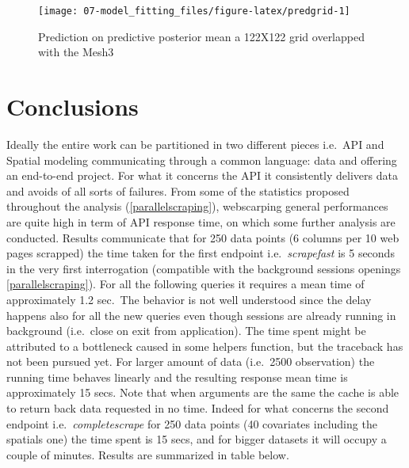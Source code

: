 \documentclass[
  12pt,
  a4paper,
  oneside]{book}
\theoremstyle{definition}
\theoremstyle{definition}
\theoremstyle{definition}
\theoremstyle{remark}
\begin{document}
\begin{figure}

{\centering \texttt{[image: 07-model\_fitting\_files/figure-latex/predgrid-1]} 

}

\caption{Prediction on predictive posterior mean a 122X122 grid overlapped with the Mesh3}\label{fig:predgrid}
\end{figure}

\hypertarget{conclusions}{%
\chapter{Conclusions}\label{conclusions}}

Ideally the entire work can be partitioned in two different pieces i.e.~API and Spatial modeling communicating through a common language: data and offering an end-to-end project. For what it concerns the API it consistently delivers data and avoids of all sorts of failures. From some of the statistics proposed throughout the analysis (\ref{parallelscraping}), webscarping general performances are quite high in term of API response time, on which some further analysis are conducted. Results communicate that for 250 data points (6 columns per 10 web pages scrapped) the time taken for the first endpoint i.e.~\emph{scrapefast} is 5 seconds in the very first interrogation (compatible with the background sessions openings \ref{parallelscraping}). For all the following queries it requires a mean time of approximately 1.2 sec.~The behavior is not well understood since the delay happens also for all the new queries even though sessions are already running in background (i.e.~close on exit from application). The time spent might be attributed to a bottleneck caused in some helpers function, but the traceback has not been pursued yet. For larger amount of data (i.e.~2500 observation) the running time behaves linearly and the resulting response mean time is approximately 15 secs. Note that when arguments are the same the cache is able to return back data requested in no time.
Indeed for what concerns the second endpoint i.e.~\emph{completescrape} for 250 data points (40 covariates including the spatials one) the time spent is 15 secs, and for bigger datasets it will occupy a couple of minutes. Results are summarized in table below.
\end{document}
